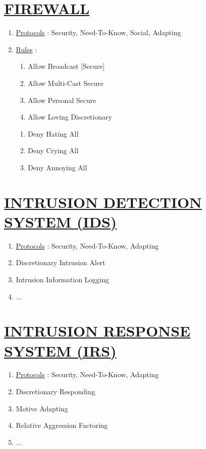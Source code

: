 \documentclass[11pt]{article}
\begin{document}
\section*{\ul{FIREWALL}}
\begin{enumerate}
	\item[] \ul{Protocols} : Security, Need-To-Know, Social, Adapting

	\item[] \ul{Rules} :
	\begin{enumerate}
		\item[] Allow Broadcast [Secure]
		\item[] Allow Multi-Cast Secure
		\item[] Allow Personal Secure
		\item[] Allow Loving Discretionary
	\end{enumerate}

	\begin{enumerate}
		\item[] Deny Hating All
		\item[] Deny Crying All
		\item[] Deny Annoying All
	\end{enumerate}

\end{enumerate}


\section*{\ul{INTRUSION DETECTION SYSTEM (IDS)}}
\begin{enumerate}
	\item[] \ul{Protocols} : Security, Need-To-Know, Adapting
	
	\item[] Discretionary Intrusion Alert
	\item[] Intrusion Information Logging
	\item[] ...
	
\end{enumerate}


\section*{\ul{INTRUSION RESPONSE SYSTEM (IRS)}}
\begin{enumerate}
	\item[] \ul{Protocols} : Security, Need-To-Know, Adapting
	
	\item[] Discretionary Responding
	\item[] Motive Adapting
	\item[] Relative Aggression Factoring
	\item[] ...
	
\end{enumerate}
\end{document}
